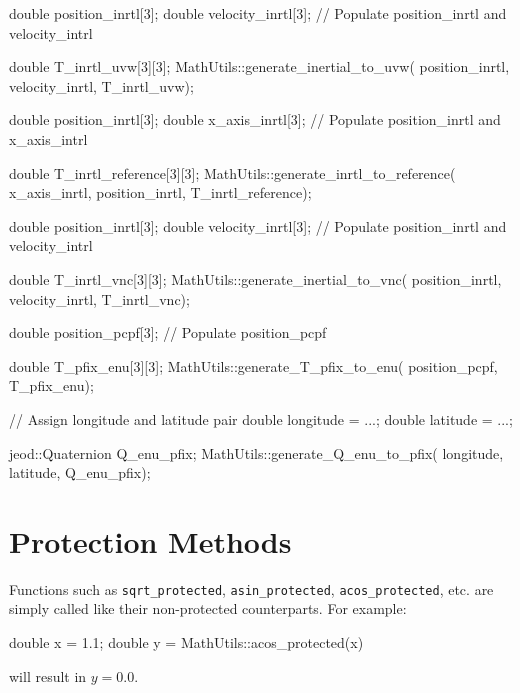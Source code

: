 \documentclass[11pt,fleqn]{report}
\begin{document}
\begin{code}
double position_inrtl[3];
double velocity_inrtl[3];
// Populate position_inrtl and velocity_intrl

double T_inrtl_uvw[3][3];
MathUtils::generate_inertial_to_uvw( position_inrtl,
velocity_inrtl,
T_inrtl_uvw);
\end{code}

\begin{code}
double position_inrtl[3];
double x_axis_inrtl[3];
// Populate position_inrtl and x_axis_intrl

double T_inrtl_reference[3][3];
MathUtils::generate_inrtl_to_reference( x_axis_inrtl,
position_inrtl,
T_inrtl_reference);
\end{code}

\begin{code}
double position_inrtl[3];
double velocity_inrtl[3];
// Populate position_inrtl and velocity_intrl

double T_inrtl_vnc[3][3];
MathUtils::generate_inertial_to_vnc( position_inrtl,
velocity_inrtl,
T_inrtl_vnc);
\end{code}

\begin{code}
double position_pcpf[3];
// Populate position_pcpf

double T_pfix_enu[3][3];
MathUtils::generate_T_pfix_to_enu( position_pcpf,
T_pfix_enu);
\end{code}

\begin{code}
// Assign longitude and latitude pair
double longitude = ...;
double latitude = ...;

jeod::Quaternion Q_enu_pfix;
MathUtils::generate_Q_enu_to_pfix( longitude,
latitude,
Q_enu_pfix);
\end{code}


\section{Protection Methods}

Functions such as \texttt{sqrt\_protected}, \texttt{asin\_protected},
\texttt{acos\_protected}, etc. are simply called like their non-protected counterparts.
For example:
\begin{code}
double x = 1.1;
double y = MathUtils::acos_protected(x)
\end{code}
will result in $y=0.0$.
\end{document}
